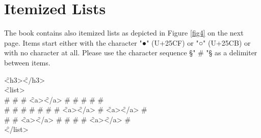 \documentclass[fontsize=11pt, paper=a4, 
  DIV15,
  normalheadings,
  parskip=half-, 
  pointlessnumbers]{scrartcl}
\begin{document}
\section{Itemized Lists}
\begin{mainrule}
  The book contains also itemized lists as depicted in Figure \ref{fig4} on the next page. Items start
  either with the character "●" (U+25CF) or "○" (U+25CB) or with no character at all.
  Please use the character sequence §" # "§ as a delimiter between items.
\end{mainrule}
  \begin{typeChinese}
    \f{<h3>}\f{</h3>}\\
    \f{<list>}\\
    \f{ # }\f{ # }\f{ # }\f{<a>}\f{</a>}\f{ # }\f{ # }\f{ # }\f{ # }\f{ # }\\
    \f{ # }\f{ # }\f{ # }\f{ # }\f{ # }\f{ # }\f{ # }\f{<a>}\f{</a>}\f{ # }\f{<a>}\f{</a> # }\\
    \f{ # }\f{ # }\f{<a>}\f{</a>}\f{ # }\f{ # }\f{ # }\f{ # }\f{<a>}\f{</a>}\f{ # }\\
    \f{</list>}
  \end{typeChinese}
\end{document}
